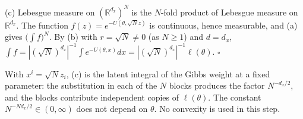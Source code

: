 \documentclass[11pt,a4paper]{article}
\begin{document}
(c) Lebesgue measure on \((\mathbb R^{d_x})^N\) is the \(N\)-fold product of Lebesgue measure on \(\mathbb R^{d_x}\). The function \(f(z)=e^{-U(\theta,\sqrt Nz)}\) is continuous, hence measurable, and (a) gives \(\bigl(\int f\bigr)^N\). By (b) with \(r=\sqrt N\ne0\) (as \(N\ge1\)) and \(d=d_x\), \(\int f=|(\sqrt N)^{d_x}|^{-1}\int e^{-U(\theta,x)}dx=|(\sqrt N)^{d_x}|^{-1}\ell(\theta)\). \(\square\)




With \(x^i=\sqrt Nz_i\), (c) is the latent integral of the Gibbs weight at a fixed parameter: the substitution in each of the \(N\) blocks produces the factor \(N^{-d_x/2}\), and the blocks contribute independent copies of \(\ell(\theta)\). The constant \(N^{-Nd_x/2}\in(0,\infty)\) does not depend on \(\theta\). No convexity is used in this step.
\end{document}
